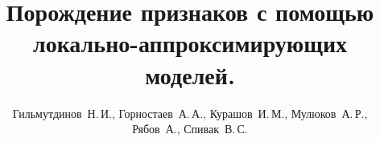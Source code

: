 \documentclass[12pt,twoside]{article}
\title
    [Порождение признаков с помощью локально-аппроксимирующих моделей.]
    {Порождение признаков с помощью локально-аппроксимирующих моделей.}
\author
    [Курашов~И.\,М.]
    {Гильмутдинов~Н.\,И., Горностаев~А.\,А., Курашов~И.\,М., Мулюков~А.\,Р., Рябов~А., Спивак~В.\,С.}
\begin{document}
\maketitle
\bigskip
\bigskip
\bigskip
\bigskip
\bigskip
\maketitleSecondary
\end{document}

